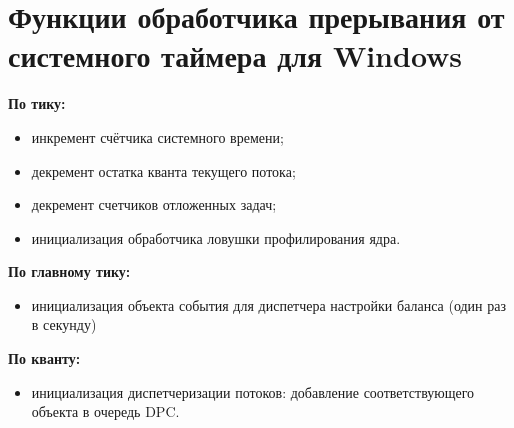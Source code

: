 \documentclass[a4paper,oneside,14pt]{extreport}
\begin{document}


\section*{Функции обработчика прерывания от системного таймера для Windows}
\noindent
\textbf{По тику:}
\begin{itemize}
	\item инкремент счётчика системного времени;
	\item декремент остатка кванта текущего потока;
	\item декремент счетчиков отложенных задач;
	\item инициализация обработчика ловушки профилирования ядра.
\end{itemize}
\textbf{По главному тику:}
\begin{itemize}
	\item инициализация объекта события для диспетчера настройки баланса (один раз в секунду)
\end{itemize}
\textbf{По кванту:}
\begin{itemize}
	\item инициализация диспетчеризации потоков:
	\newline добавление соответствующего объекта в очередь DPC.
\end{itemize}
\end{document}
